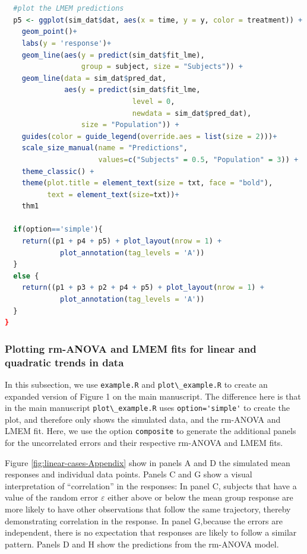 \documentclass[
]{article}
\newcommand{\passthrough}[1]{#1}
\begin{document}
\begin{lstlisting}[language=R]
  
  
  #plot the LMEM predictions
  p5 <- ggplot(sim_dat$dat, aes(x = time, y = y, color = treatment)) +
    geom_point()+
    labs(y = 'response')+
    geom_line(aes(y = predict(sim_dat$fit_lme),
                  group = subject, size = "Subjects")) +
    geom_line(data = sim_dat$pred_dat,
              aes(y = predict(sim_dat$fit_lme, 
                              level = 0,
                              newdata = sim_dat$pred_dat),
                  size = "Population")) +
    guides(color = guide_legend(override.aes = list(size = 2)))+
    scale_size_manual(name = "Predictions",
                      values=c("Subjects" = 0.5, "Population" = 3)) +
    theme_classic() +
    theme(plot.title = element_text(size = txt, face = "bold"),
          text = element_text(size=txt))+
    thm1
  
  if(option=='simple'){
    return((p1 + p4 + p5) + plot_layout(nrow = 1) + 
             plot_annotation(tag_levels = 'A'))
  }
  else {
    return((p1 + p3 + p2 + p4 + p5) + plot_layout(nrow = 1) + 
             plot_annotation(tag_levels = 'A'))
  }
}
\end{lstlisting}

\hypertarget{plotting-rm-anova-and-lmem-fits-for-linear-and-quadratic-trends-in-data}{%
\subsubsection{Plotting rm-ANOVA and LMEM fits for linear and quadratic trends in data}\label{plotting-rm-anova-and-lmem-fits-for-linear-and-quadratic-trends-in-data}}

In this subsection, we use \passthrough{\lstinline!example.R!} and \passthrough{\lstinline!plot\_example.R!} to create an expanded version of Figure 1 on the main manuscript. The difference here is that in the main manuscript \passthrough{\lstinline!plot\_example.R!} uses \passthrough{\lstinline!option='simple'!} to create the plot, and therefore only shows the simulated data, and the rm-ANOVA and LMEM fit. Here, we use the option \passthrough{\lstinline!composite!} to generate the additional panels for the uncorrelated errors and their respective rm-ANOVA and LMEM fits.

Figure \ref{fig:linear-cases-Appendix} show in panels A and D the simulated mean responses and individual data points. Panels C and G show a visual interpretation of ``correlation'' in the responses: In panel C, subjects that have a value of the random error \(\varepsilon\) either above or below the mean group response are more likely to have other observations that follow the same trajectory, thereby demonstrating correlation in the response. In panel G,because the errors are independent, there is no expectation that responses are likely to follow a similar pattern. Panels D and H show the predictions from the rm-ANOVA model.
\end{document}
